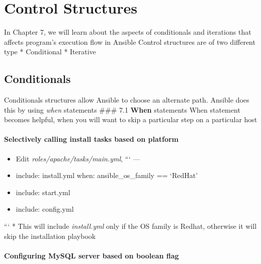 \chapter{Control Structures}

In Chapter 7, we will learn about the aspects of conditionals and iterations that affects program's execution flow in Ansible\newline
Control structures are of two different type\newline
* Conditional
* Iterative  

\section{Conditionals}

Conditionals structures allow Ansible to choose an alternate path. Ansible does this by using \emph{when} statements\newline
\#\#\# 7.1 \textbf{When} statements\newline
When statement becomes helpful, when you will want to skip a particular step on a particular host

\subsubsection{Selectively calling install tasks based on platform}

\begin{itemize}
\item Edit \emph{roles/apache/tasks/main.yml},
  ```
  ---
\item include: install.yml
when: ansible\_os\_family == `RedHat'
\item include: start.yml
\item include: config.yml
\end{itemize}

```
  * This will include \emph{install.yml} only if the OS family is Redhat, otherwise it will skip the installation playbook  

\subsubsection{Configuring MySQL server based on boolean flag}


